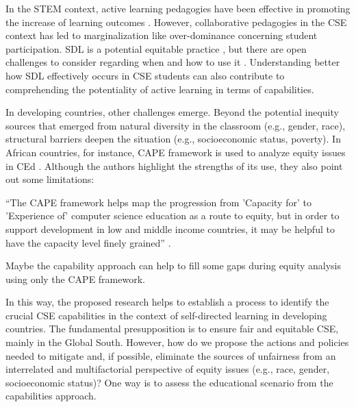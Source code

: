 In the \gls{STEM} context, active learning pedagogies have been effective in promoting the increase of learning outcomes \cite{prince:2004}. However, collaborative pedagogies in the \gls{CSE} context has led to marginalization \cite{lewis:2015} like over-dominance concerning student participation. \acrfull{SDL} is a potential equitable practice \cite{anderson:2022}, but there are open challenges to consider regarding when and how to use it \cite{brookfield:1993}. Understanding better how \gls{SDL} effectively occurs in \gls{CSE} students can also contribute to comprehending the potentiality of active learning in terms of capabilities.

In developing countries, other challenges emerge. Beyond the potential inequity sources that emerged from natural diversity in the classroom (e.g., gender, race), structural barriers deepen the situation (e.g., socioeconomic status, poverty). In African countries, for instance, \gls{CAPE} framework is used to analyze equity issues in \gls{CEd} \cite{tshukudu:2023}. Although the authors highlight the strengths of its use, they also point out some limitations: 
\begin{citacao}
    ``The \gls{CAPE} framework helps map the progression from 'Capacity for' to 'Experience of' computer science education as a route to equity, but in order to support development in low and middle income countries, it may be helpful to have the capacity level finely grained'' \cite[p.~1]{tshukudu:2023}.
\end{citacao}
Maybe the capability approach can help to fill some gaps during equity analysis using only the \gls{CAPE} framework.

 In this way, the proposed research helps to establish a process to identify the crucial \gls{CSE} capabilities in the context of self-directed learning in developing countries. The fundamental presupposition is to ensure fair and equitable \gls{CSE}, mainly in the Global South. However, how do we propose the actions and policies needed to mitigate and, if possible, eliminate the sources of unfairness from an interrelated and multifactorial perspective of equity issues (e.g., race, gender, socioeconomic status)? One way is to assess the educational scenario from the capabilities approach.